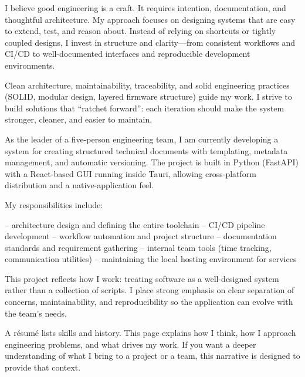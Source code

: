 \documentclass[9pt]{developercv}
\begin{document}
I believe good engineering is a craft. It requires intention, documentation, and thoughtful
architecture. My approach focuses on designing systems that are easy to extend, test, and
reason about. Instead of relying on shortcuts or tightly coupled designs, I invest in
structure and clarity—from consistent workflows and CI/CD to well-documented interfaces
and reproducible development environments.

Clean architecture, maintainability, traceability, and solid engineering practices
(SOLID, modular design, layered firmware structure) guide my work. I strive to build
solutions that “ratchet forward”: each iteration should make the system stronger, cleaner,
and easier to maintain.



As the leader of a five-person engineering team, I am currently developing a system for
creating structured technical documents with templating, metadata management, and automatic
versioning. The project is built in Python (FastAPI) with a React-based GUI running inside
Tauri, allowing cross-platform distribution and a native-application feel.

My responsibilities include:

– architecture design and defining the entire toolchain  
– CI/CD pipeline development  
– workflow automation and project structure  
– documentation standards and requirement gathering  
– internal team tools (time tracking, communication utilities)  
– maintaining the local hosting environment for services  

This project reflects how I work: treating software as a well-designed system rather than
a collection of scripts. I place strong emphasis on clear separation of concerns,
maintainability, and reproducibility so the application can evolve with the team’s needs.



A résumé lists skills and history.  
This page explains how I think, how I approach engineering problems, and what drives
my work. If you want a deeper understanding of what I bring to a project or a team,
this narrative is designed to provide that context.
\end{document}

